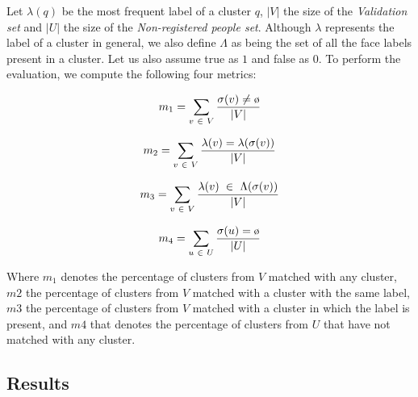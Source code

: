 Let $\lambda(q)$ be the most frequent label of a cluster $q$, $|V|$ the size of the \emph{Validation set} and $|U|$ the size of the \emph{Non-registered people set}.
Although $\lambda$ represents the label of a cluster in general, we also define $\Lambda$ as being the set of all the face labels present in a cluster.
Let us also assume true as $1$ and false as $0$.
To perform the evaluation, we compute the following four metrics:

\vspace{2em}
\noindent\begin{minipage}[c]{0.45\linewidth}
    \begin{equation}
    \small
    m_1 = \sum_{v~\in~V}{\frac{\sigma(v)\ne\text{\o}}{|V|}}
    \end{equation}
\end{minipage}
\hfill
\begin{minipage}[c]{0.45\linewidth}
    \begin{equation}
    \small
    m_2 = \sum_{v~\in~V}{\frac{\lambda(v) = \lambda(\sigma(v))}{|V|}}    
    \end{equation}
\end{minipage}

\vspace{1em}

\noindent\begin{minipage}[c]{0.45\linewidth}
    \begin{equation}
    \small
    m_3 = \sum_{v~\in~V}{\frac{\lambda(v)~\in~\Lambda(\sigma(v))}{|V|}} 
    \end{equation}
\end{minipage}
\hfill
\begin{minipage}[c]{0.45\linewidth}
    \begin{equation}
    \small
    m_4 = \sum_{u~\in~U}{\frac{\sigma(u)=\text{\o}}{|U|}}
    \end{equation}
\end{minipage}
\vspace{2em}

Where $m_1$ denotes the percentage of clusters from $V$ matched with any cluster, $m2$ the percentage of clusters from $V$ matched with a cluster with the same label, $m3$ the percentage of clusters from $V$ matched with a cluster in which the label is present, and $m4$ that denotes the percentage of clusters from $U$ that have not matched with any cluster.

\subsection{Results}


